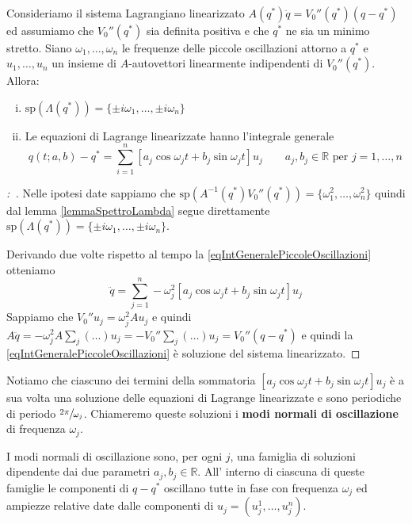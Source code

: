 \documentclass[11pt,a4paper,twoside]{book}
\newenvironment{proposizione}[1][\empty]{\begin{Proposizione}{
\ifx\empty#1\relax\else\mdseries\itshape#1\\\fi
}{}}{\end{Proposizione}}
\newenvironment{dimo}[1][\proofname]{
	\begin{tcolorbox}[
	breakable, 
	enhanced, 
	interior hidden, 
	frame hidden, 
	borderline west = {1pt}{0pt}{gray}, 
	top=0pt, bottom=0pt, left=0pt]
\begin{proof}[#1:~]
}
{
\end{proof}
\end{tcolorbox}
}
\theoremstyle{esss}
\theoremstyle{dotless}
\numberwithin{equation}{section} %
\begin{document}
\begin{proposizione}
Consideriamo il sistema Lagrangiano linearizzato $A(q^*)\ddot{q}=V_0''(q^*)(q-q^*)$ ed assumiamo che $V_0''(q^*)$ sia definita positiva e che $q^*$ ne sia un minimo stretto.
Siano $\omega_1,\dots,\omega_n$ le frequenze delle piccole oscillazioni attorno a $q^*$ e $u_1,\dots,u_n$ un insieme di $A$-autovettori linearmente indipendenti di $V_0''(q^*)$. Allora:\begin{enumerate}[i.]
\item $\text{sp}(\Lambda(q^*))=\{\pm i\omega_1,\dots,\pm i\omega_n\}$
\item Le equazioni di Lagrange linearizzate hanno l'integrale generale
\begin{equation}\label{eqIntGeneralePiccoleOscillazioni}
q(t;a,b)-q^*=\sum_{i=1}^n\left[  a_j\cos{\omega_j t} + b_j\sin{\omega_jt} \right]u_j \qquad a_j,b_j\in\mathbb{R} \text{ per } j=1,\dots, n
\end{equation}
\end{enumerate}
\end{proposizione}
\begin{dimo}
Nelle ipotesi date sappiamo che $\text{sp}(A^{-1}(q^*)V_0''(q^*))=\{\omega_1^2,\dots,\omega_n^2\} $ quindi dal lemma \ref{lemmaSpettroLambda} segue direttamente $\text{sp}(\Lambda(q^*))=\{\pm i\omega_1,\dots,\pm i\omega_n\}$.

Derivando due volte rispetto al tempo la \ref{eqIntGeneralePiccoleOscillazioni} otteniamo
\[
\ddot{q}=\sum_{j=1}^n -\omega_j^2 \left[a_j\cos{\omega_jt}+b_j\sin{\omega_jt}\right]u_j
\]
Sappiamo che $V_0'' u_j = \omega_j^2 A u_j$ e quindi $A\ddot{q}=-\omega_j^2A\sum_j(\dots)u_j=-V_0'' \sum_j(\dots) u_j=V_0''(q-q^*)$ e quindi la \ref{eqIntGeneralePiccoleOscillazioni} è soluzione del sistema linearizzato.\qedhere
\end{dimo}

Notiamo che ciascuno dei termini della sommatoria $\left[a_j\cos{\omega_j t} + b_j\sin{\omega_jt} \right]u_j$ è a sua volta una soluzione delle equazioni di Lagrange linearizzate e sono periodiche di periodo $\sfrac{2\pi}{\omega_j}$. Chiameremo queste soluzioni i \textbf{modi normali di oscillazione} di frequenza $\omega_j$.

I modi normali di oscillazione sono, per ogni $j$, una famiglia di soluzioni dipendente dai due parametri $a_j,b_j\in\mathbb{R}$. All' interno di ciascuna di queste famiglie le componenti di $q-q^*$ oscillano tutte in fase con frequenza $\omega_j$ ed ampiezze relative date dalle componenti di $u_j=(u_j^1,\dots,u_j^n)$.
\end{document}
